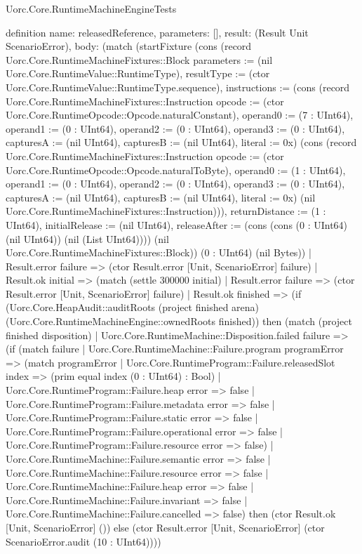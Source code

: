 \begin{lexlean}{Uorc.Core.RuntimeMachineEngineTests}
\begin{semanticmodule}
definition{
  name: releasedReference,
  parameters: [],
  result: (Result Unit ScenarioError),
  body: (match (startFixture (cons (record Uorc.Core.RuntimeMachineFixtures::Block {parameters := (nil Uorc.Core.RuntimeValue::RuntimeType), resultType := (ctor Uorc.Core.RuntimeValue::RuntimeType.sequence), instructions := (cons (record Uorc.Core.RuntimeMachineFixtures::Instruction {opcode := (ctor Uorc.Core.RuntimeOpcode::Opcode.naturalConstant), operand0 := (7 : UInt64), operand1 := (0 : UInt64), operand2 := (0 : UInt64), operand3 := (0 : UInt64), capturesA := (nil UInt64), capturesB := (nil UInt64), literal := 0x}) (cons (record Uorc.Core.RuntimeMachineFixtures::Instruction {opcode := (ctor Uorc.Core.RuntimeOpcode::Opcode.naturalToByte), operand0 := (1 : UInt64), operand1 := (0 : UInt64), operand2 := (0 : UInt64), operand3 := (0 : UInt64), capturesA := (nil UInt64), capturesB := (nil UInt64), literal := 0x}) (nil Uorc.Core.RuntimeMachineFixtures::Instruction))), returnDistance := (1 : UInt64), initialRelease := (nil UInt64), releaseAfter := (cons (cons (0 : UInt64) (nil UInt64)) (nil (List UInt64)))}) (nil Uorc.Core.RuntimeMachineFixtures::Block)) (0 : UInt64) (nil Bytes))
    | Result.error failure => (ctor Result.error [Unit, ScenarioError] failure)
    | Result.ok initial => (match (settle 300000 initial)
      | Result.error failure => (ctor Result.error [Unit, ScenarioError] failure)
      | Result.ok finished => (if (Uorc.Core.HeapAudit::auditRoots (project finished arena) (Uorc.Core.RuntimeMachineEngine::ownedRoots finished)) then (match (project finished disposition)
        | Uorc.Core.RuntimeMachine::Disposition.failed failure => (if (match failure
          | Uorc.Core.RuntimeMachine::Failure.program programError => (match programError
            | Uorc.Core.RuntimeProgram::Failure.releasedSlot index => (prim equal index (0 : UInt64) : Bool)
            | Uorc.Core.RuntimeProgram::Failure.heap error => false
            | Uorc.Core.RuntimeProgram::Failure.metadata error => false
            | Uorc.Core.RuntimeProgram::Failure.static error => false
            | Uorc.Core.RuntimeProgram::Failure.operational error => false
            | Uorc.Core.RuntimeProgram::Failure.resource error => false)
          | Uorc.Core.RuntimeMachine::Failure.semantic error => false
          | Uorc.Core.RuntimeMachine::Failure.resource error => false
          | Uorc.Core.RuntimeMachine::Failure.heap error => false
          | Uorc.Core.RuntimeMachine::Failure.invariant => false
          | Uorc.Core.RuntimeMachine::Failure.cancelled => false) then (ctor Result.ok [Unit, ScenarioError] ()) else (ctor Result.error [Unit, ScenarioError] (ctor ScenarioError.audit (10 : UInt64))))
}
\end{semanticmodule}
\end{lexlean}
